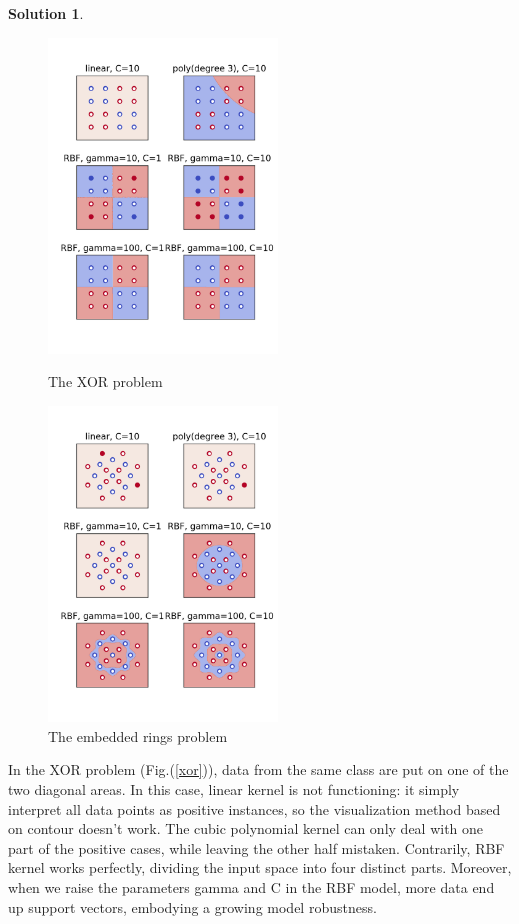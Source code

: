 \documentclass[a4paper,UTF8]{article}
\numberwithin{equation}{section}
\theoremstyle{definition}
\newtheorem*{solution}{Solution}
\begin{document}
\begin{solution}
\begin{figure}[htbp] %
\begin{minipage}[t]{0.48\linewidth}
   \centering
   \includegraphics[width=2.4in]{fig_1.png}
   \caption{The XOR problem}
   \label{xor}
\end{minipage}
\begin{minipage}[t]{0.48\linewidth}
   \centering
   \includegraphics[width=2.4in]{fig_2.png}
   \caption{The embedded rings problem}
   \label{ring}
\end{minipage}
\end{figure}

In the XOR problem (Fig.(\ref{xor})), data from the same class are put on one of the two diagonal areas. In this case, linear kernel is not functioning: it simply interpret all data points as positive instances, so the visualization method based on contour doesn't work. The cubic polynomial kernel can only deal with one part of the positive cases, while leaving the other half mistaken. Contrarily, RBF kernel works perfectly, dividing the input space into four distinct parts. Moreover, when we raise the parameters gamma and C in the RBF model, more data end up support vectors, embodying a growing model robustness.


\end{solution}
\end{document}
